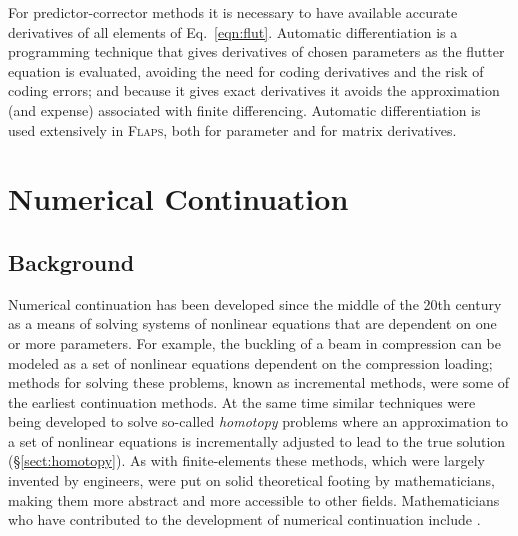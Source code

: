 \documentclass[11pt,openany,twoside]{book}
\numberwithin{equation}{section}		%
\newcommand{\Newterm}[1]{{\em #1}}
\newcommand{\Flaps}{\textsc{Flaps\:}}
\newcommand{\Sectref}[1]{\S\ref{#1}}
\newcommand{\Eqn}[1]{Eq.\ \ref{#1}}  %
\begin{document}
For predictor-corrector methods it is necessary to have available
accurate derivatives of all elements of \Eqn{eqn:flut}. Automatic differentiation
is a programming technique that gives derivatives of chosen parameters
as the flutter equation is evaluated, avoiding the need for coding derivatives
and the risk of coding errors; and because it gives exact derivatives it
avoids the approximation (and expense) associated with finite differencing.
Automatic differentiation is used extensively in \Flaps, both for parameter
and for matrix derivatives.

\newpage
\section{Numerical Continuation}\label{sect:continuation}
\subsection{Background}
Numerical continuation has been developed since the middle of the
20th century as a means of solving systems of nonlinear equations that
are dependent on one or more parameters. For example, 
the buckling of a beam in compression can be modeled as a set of
nonlinear equations dependent on the compression loading; methods for
solving these problems, known as incremental methods,
were some of the earliest continuation methods.
At the same time similar techniques were being developed to solve
so-called \Newterm{homotopy} problems where an approximation to a set
of nonlinear equations is incrementally adjusted to lead to the true
solution (\Sectref{sect:homotopy}).
As with finite-elements these methods, which were largely
invented by engineers, were put on solid theoretical footing by
mathematicians, making them more abstract and more accessible to other
fields. Mathematicians who have contributed to the development of
numerical continuation include
\cite{allgower1990numerical,
keller1987lectures,
rheinboldt1981numerical,
rheinboldt1983locally,
rheinboldt1983algorithm,rheinboldt1986numerical}.
\end{document}
